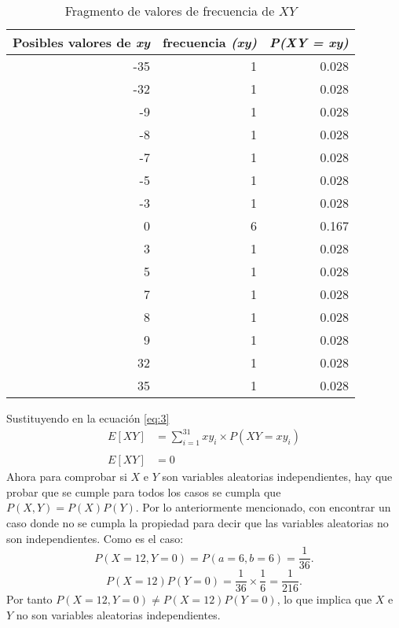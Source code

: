\documentclass{article}
\begin{document}
\begin{table}[H]
  \centering
  \caption{Fragmento de valores de frecuencia de $XY$}
    \begin{tabular}{rrr}
    \toprule
    \multicolumn{1}{p{5.39em}}{\textbf{Posibles valores de \textit{\textbf{xy}}}} & \multicolumn{1}{l}{\textbf{frecuencia  \textit{\textbf{(xy)}}}}  & \multicolumn{1}{l}{\textit{\textbf{P(XY = xy)}}} \\
    \midrule
    -35   & 1     & 0.028 \\
    -32   & 1     & 0.028 \\
    -9    & 1     & 0.028 \\
    -8    & 1     & 0.028 \\
    -7    & 1     & 0.028 \\
    -5    & 1     & 0.028 \\
    -3    & 1     & 0.028 \\
    0     & 6     & 0.167 \\
    3     & 1     & 0.028 \\
    5     & 1     & 0.028 \\
    7     & 1     & 0.028 \\
    8     & 1     & 0.028 \\
    9     & 1     & 0.028 \\
    32    & 1     & 0.028 \\
    35    & 1     & 0.028 \\
    \bottomrule
    \end{tabular}%
  \label{tab:3}%
\end{table}%
Sustituyendo en la ecuación \ref{eq:3}
\begin{equation}
\begin{array}{ll}
   E[XY] &= \sum_{i=1}^{31} xy_{i}  \times P(XY=xy_{i})\\
   &\\
   E[XY] & = 0
  \end{array}
\end{equation}
Ahora para comprobar si $X$ e $Y$ son variables aleatorias independientes, hay que probar que se cumple para todos los casos se cumpla que $P(X,Y) = P(X)P(Y)$. Por lo anteriormente mencionado, con encontrar un caso donde no se cumpla la propiedad para decir que las variables aleatorias  no son independientes. Como es el caso:
\begin{equation}
 P(X=12,Y=0) = P(a=6 , b=6) = \frac{1}{36} .  
\end{equation}
\begin{equation}
 P(X=12)P(Y=0) = \frac{1}{36} \times \frac{1}{6} = \frac{1}{216}.  
\end{equation}
Por tanto   $P(X=12,Y=0) \neq P(X=12)P(Y=0)$, lo que implica que $X$ e $Y$ no son variables aleatorias independientes.
\end{document}
